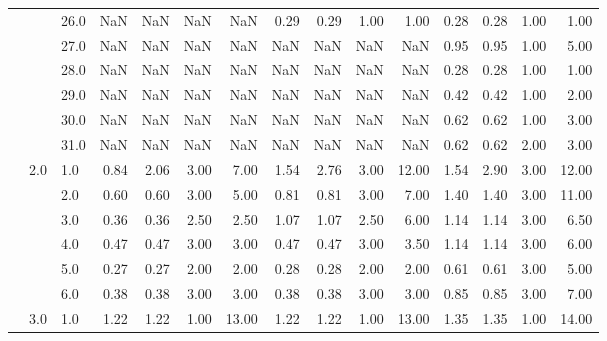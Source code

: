 \begin{tabular}{lllrrrrrrrrrrrr}
       &     & 26.0 &        NaN &       NaN &  NaN &    NaN &       0.29 &      0.29 & 1.00 &   1.00 &       0.28 &      0.28 & 1.00 &   1.00 \\
       &     & 27.0 &        NaN &       NaN &  NaN &    NaN &        NaN &       NaN &  NaN &    NaN &       0.95 &      0.95 & 1.00 &   5.00 \\
       &     & 28.0 &        NaN &       NaN &  NaN &    NaN &        NaN &       NaN &  NaN &    NaN &       0.28 &      0.28 & 1.00 &   1.00 \\
       &     & 29.0 &        NaN &       NaN &  NaN &    NaN &        NaN &       NaN &  NaN &    NaN &       0.42 &      0.42 & 1.00 &   2.00 \\
       &     & 30.0 &        NaN &       NaN &  NaN &    NaN &        NaN &       NaN &  NaN &    NaN &       0.62 &      0.62 & 1.00 &   3.00 \\
       &     & 31.0 &        NaN &       NaN &  NaN &    NaN &        NaN &       NaN &  NaN &    NaN &       0.62 &      0.62 & 2.00 &   3.00 \\
       & 2.0 & 1.0  &       0.84 &      2.06 & 3.00 &   7.00 &       1.54 &      2.76 & 3.00 &  12.00 &       1.54 &      2.90 & 3.00 &  12.00 \\
       &     & 2.0  &       0.60 &      0.60 & 3.00 &   5.00 &       0.81 &      0.81 & 3.00 &   7.00 &       1.40 &      1.40 & 3.00 &  11.00 \\
       &     & 3.0  &       0.36 &      0.36 & 2.50 &   2.50 &       1.07 &      1.07 & 2.50 &   6.00 &       1.14 &      1.14 & 3.00 &   6.50 \\
       &     & 4.0  &       0.47 &      0.47 & 3.00 &   3.00 &       0.47 &      0.47 & 3.00 &   3.50 &       1.14 &      1.14 & 3.00 &   6.00 \\
       &     & 5.0  &       0.27 &      0.27 & 2.00 &   2.00 &       0.28 &      0.28 & 2.00 &   2.00 &       0.61 &      0.61 & 3.00 &   5.00 \\
       &     & 6.0  &       0.38 &      0.38 & 3.00 &   3.00 &       0.38 &      0.38 & 3.00 &   3.00 &       0.85 &      0.85 & 3.00 &   7.00 \\
       & 3.0 & 1.0  &       1.22 &      1.22 & 1.00 &  13.00 &       1.22 &      1.22 & 1.00 &  13.00 &       1.35 &      1.35 & 1.00 &  14.00 \\
\bottomrule
\end{tabular}

